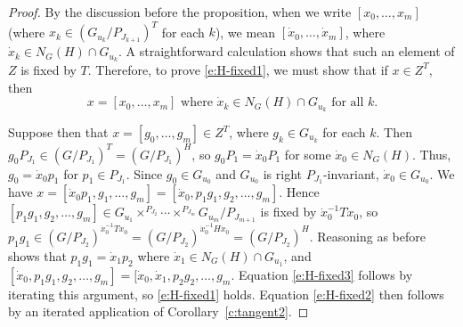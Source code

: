 \documentclass[11pt,letterpaper,reqno]{amsart}
\numberwithin{equation}{section}
\theoremstyle{plain}
\theoremstyle{definition}
\theoremstyle{remark}
\begin{document}
\begin{proof}
By the discussion before the proposition, when we write $[x_0,\ldots,x_m]$ (where $ x_k  \in (G_{u_k}/P_{J_{k+1}})^T$ for each $k$),
we mean $[\dot{x}_0, \ldots, \dot{x}_m]$, where $\dot{x}_k \in N_G(H) \cap G_{u_k}$.  A straightforward calculation
shows that such an element of $Z$ is fixed by $T$.  Therefore, to prove \eqref{e:H-fixed1}, we must show that if
$x \in Z^T$, then
\begin{equation} \label{e:H-fixed3}
x = [x_0,\ldots,x_m] \mbox{  where  } \dot{x}_k \in N_G(H) \cap G_{u_k} \mbox{  for all  }k.
\end{equation}

Suppose then that $x = [g_0, \ldots, g_m] \in Z^T$, where $g_k \in G_{u_k}$ for each $k$.  Then $g_0 P_{J_1} \in (G/P_{J_1})^T = (G/P_{J_1})^H$,
so $g_0 P_1 = \dot{x}_0 P_1$ for some $\dot{x}_0 \in N_G(H)$.  Thus, $g_0 = \dot{x}_0 p_1$ for $p_1 \in P_{J_1}$.  Since 
$g_0 \in G_{u_0}$ and $G_{u_0}$ is right
$P_{J_1}$-invariant, $\dot{x}_0 \in G_{u_0}$.  We have
$x = [\dot{x}_0 p_1, g_1, \ldots, g_m] = [\dot{x}_0, p_1 g_1, g_2, \ldots, g_m]$.  
Hence
$[p_1 g_1, g_2, \ldots, g_m] \in G_{u_1} \times^{P_{J_2}} \cdots \times^{P_{J_m}} G_{u_m}/P_{J_{m+1}}$ is
fixed by $\dot{x}_0^{-1} T \dot{x}_0$, so $p_1 g_1 \in (G/P_{J_2})^{\dot{x}_0^{-1} T \dot{x}_0} =  (G/P_{J_2})^{\dot{x}_0^{-1} H \dot{x}_0}
= (G/P_{J_2})^H$.  Reasoning as before shows that $p_1 g_1 = \dot{x}_1 p_2$ where $\dot{x}_1 \in N_G(H) \cap G_{u_1}$, and
$ [\dot{x}_0, p_1 g_1, g_2, \ldots, g_m] = [\dot{x}_0, \dot{x}_1, p_2 g_2, \ldots, g_m $.  Equation \eqref{e:H-fixed3}
follows by iterating this argument, so
\eqref{e:H-fixed1} holds.  Equation \eqref{e:H-fixed2} then
follows by an iterated application of Corollary~\ref{c:tangent2}.
\end{proof}
\end{document}
